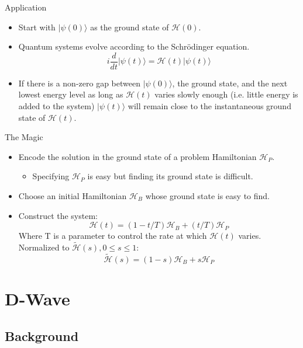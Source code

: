 \documentclass{beamer}
\begin{document}
\begin{frame}{Application}

  \begin{itemize}
   \item Start with \(|\psi(0)\rangle\) as the ground state of \(\mathcal{H}(0)\).
    \pause
   \item Quantum systems evolve according to the Schr\"{o}dinger equation.
     \[ i \frac{d}{dt} |\psi(t)\rangle = \mathcal{H}(t)|\psi(t)\rangle\]
    \pause
   \item If there is a non-zero gap between \(|\psi(0)\rangle\), the ground state, and the next lowest energy level as long as \(\mathcal{H}(t)\) varies slowly enough (i.e. little energy is added to the system) \(|\psi(t)\rangle\) will remain close to the instantaneous ground state of \(\mathcal{H}(t)\).
  \end{itemize}

\end{frame}

\begin{frame}{The Magic}
\pause
  \begin{itemize}
   \item Encode the solution in the ground state of a problem Hamiltonian \(\mathcal{H}_P\).
    \begin{itemize}
     \item Specifying \(\mathcal{H}_P\) is easy but finding its ground state is difficult.
    \end{itemize}
   \item Choose an initial Hamiltonian \(\mathcal{H}_B\) whose ground state is easy to find.
   \item Construct the system: \[\mathcal{H}(t) = (1-t/T)\mathcal{H}_B + (t/T)\mathcal{H}_P\] Where T is a parameter to control the rate at which \(\mathcal{H}(t)\) varies.  Normalized to \(\tilde{\mathcal{H}}(s), 0 \leq s\leq 1\): \[\tilde{\mathcal{H}}(s) = (1-s)\mathcal{H}_B + s\mathcal{H}_P\]

  \end{itemize}

\end{frame}

\section{D-Wave}

\subsection{Background}
\end{document}
